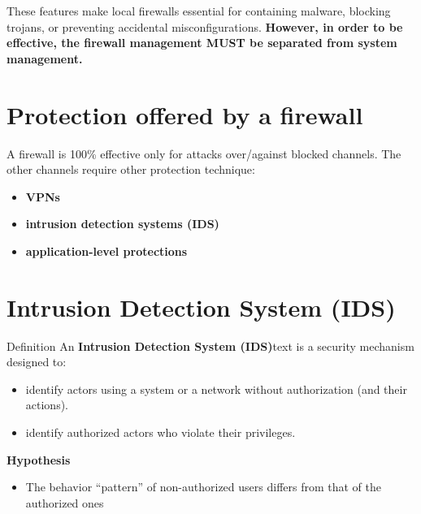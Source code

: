 \noindent
These features make local firewalls essential for containing malware, blocking trojans, or preventing accidental misconfigurations. \textbf{However, in order to be effective, the firewall management MUST be separated from system management.}

\section{Protection offered by a firewall}
A firewall is 100\% effective only for attacks over/against blocked channels.
The other channels require other protection technique:
\begin{itemize}
    \item \textbf{VPNs}
    \item \textbf{intrusion detection systems (IDS)}
    \item \textbf{application-level protections}
\end{itemize}
\noindent{\color{gray!50}\rule{\textwidth}{0.5pt}}
\section{Intrusion Detection System (IDS)}
\begin{quotebox-yellow}{Definition}
An \textbf{Intrusion Detection System (IDS)}text is a security mechanism designed to:
\begin{itemize}
    \item identify actors using a system or a network without authorization (and their actions).
    \item  identify authorized actors who violate their privileges.
\end{itemize}
\textbf{Hypothesis}
\begin{itemize}
    \item The behavior “pattern” of non-authorized users differs from that of the authorized ones
\end{itemize}
\end{quotebox-yellow}

